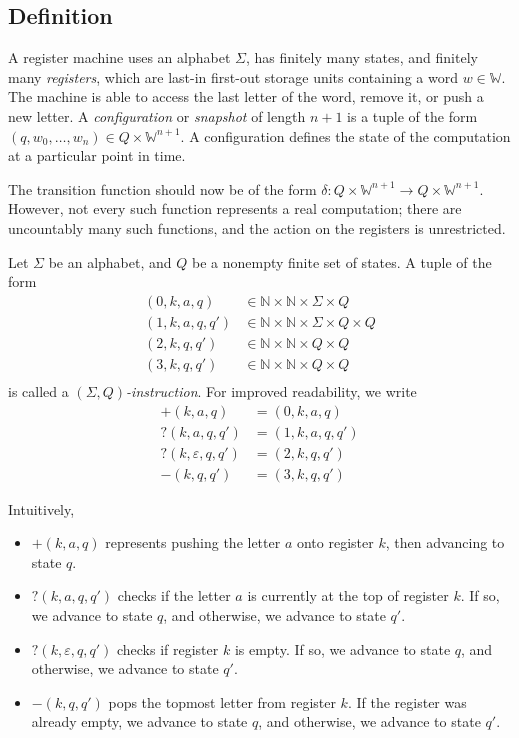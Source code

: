 \subsection{Definition}
A register machine uses an alphabet \( \Sigma \), has finitely many states, and finitely many \emph{registers}, which are last-in first-out storage units containing a word \( w \in \mathbb W \).
The machine is able to access the last letter of the word, remove it, or push a new letter.
A \emph{configuration} or \emph{snapshot} of length \( n+1 \) is a tuple of the form \( (q, w_0, \dots, w_n) \in Q \times \mathbb W^{n+1} \).
A configuration defines the state of the computation at a particular point in time.

The transition function should now be of the form \( \delta \colon Q \times \mathbb W^{n+1} \to Q \times \mathbb W^{n+1} \).
However, not every such function represents a real computation; there are uncountably many such functions, and the action on the registers is unrestricted.
\begin{definition}
	Let \( \Sigma \) be an alphabet, and \( Q \) be a nonempty finite set of states.
	A tuple of the form
	\begin{align*}
		(0,k,a,q) &\in \mathbb N \times \mathbb N \times \Sigma \times Q \\
		(1,k,a,q,q') &\in \mathbb N \times \mathbb N \times \Sigma \times Q \times Q \\
		(2,k,q,q') &\in \mathbb N \times \mathbb N \times Q \times Q \\
		(3,k,q,q') &\in \mathbb N \times \mathbb N \times Q \times Q \\
	\end{align*}
	is called a \emph{\( (\Sigma, Q) \)-instruction}.
	For improved readability, we write
	\begin{align*}
		+(k,a,q) &= (0,k,a,q) \\
		?(k,a,q,q') &= (1,k,a,q,q') \\
		?(k,\varepsilon,q,q') &= (2,k,q,q') \\
		-(k,q,q') &= (3,k,q,q')
	\end{align*}
\end{definition}
Intuitively,
\begin{itemize}
	\item \( +(k,a,q) \) represents pushing the letter \( a \) onto register \( k \), then advancing to state \( q \).
	\item \( ?(k,a,q,q') \) checks if the letter \( a \) is currently at the top of register \( k \).
		If so, we advance to state \( q \), and otherwise, we advance to state \( q' \).
	\item \( ?(k,\varepsilon,q,q') \) checks if register \( k \) is empty.
		If so, we advance to state \( q \), and otherwise, we advance to state \( q' \).
	\item \( -(k,q,q') \) pops the topmost letter from register \( k \).
		If the register was already empty, we advance to state \( q \), and otherwise, we advance to state \( q' \).
\end{itemize}
